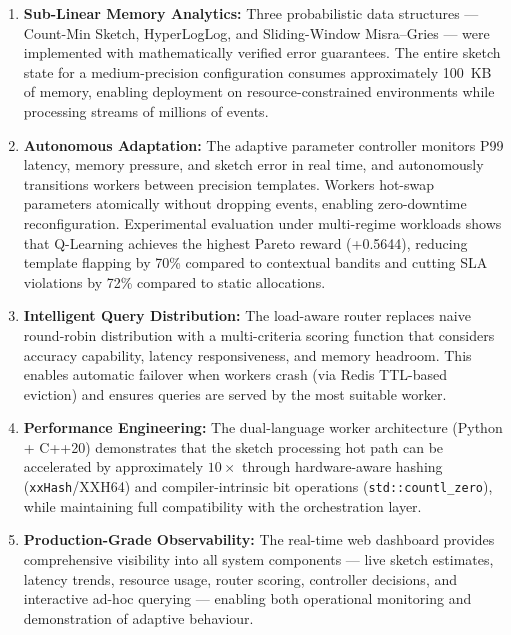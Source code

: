 \begin{enumerate}
 \item \textbf{Sub-Linear Memory Analytics:} Three probabilistic data structures — Count-Min Sketch, HyperLogLog, and Sliding-Window Misra--Gries — were implemented with mathematically verified error guarantees. The entire sketch state for a medium-precision configuration consumes approximately 100~KB of memory, enabling deployment on resource-constrained environments while processing streams of millions of events.

 \item \textbf{Autonomous Adaptation:} The adaptive parameter controller monitors P99 latency, memory pressure, and sketch error in real time, and autonomously transitions workers between precision templates. Workers hot-swap parameters atomically without dropping events, enabling zero-downtime reconfiguration. Experimental evaluation under multi-regime workloads shows that Q-Learning achieves the highest Pareto reward (+0.5644), reducing template flapping by 70\% compared to contextual bandits and cutting SLA violations by 72\% compared to static allocations.

 \item \textbf{Intelligent Query Distribution:} The load-aware router replaces naive round-robin distribution with a multi-criteria scoring function that considers accuracy capability, latency responsiveness, and memory headroom. This enables automatic failover when workers crash (via Redis TTL-based eviction) and ensures queries are served by the most suitable worker.

 \item \textbf{Performance Engineering:} The dual-language worker architecture (Python + C++20) demonstrates that the sketch processing hot path can be accelerated by approximately $10\times$ through hardware-aware hashing (\texttt{xxHash}/XXH64) and compiler-intrinsic bit operations (\texttt{std::countl\_zero}), while maintaining full compatibility with the orchestration layer.

 \item \textbf{Production-Grade Observability:} The real-time web dashboard provides comprehensive visibility into all system components — live sketch estimates, latency trends, resource usage, router scoring, controller decisions, and interactive ad-hoc querying — enabling both operational monitoring and demonstration of adaptive behaviour.
\end{enumerate}

